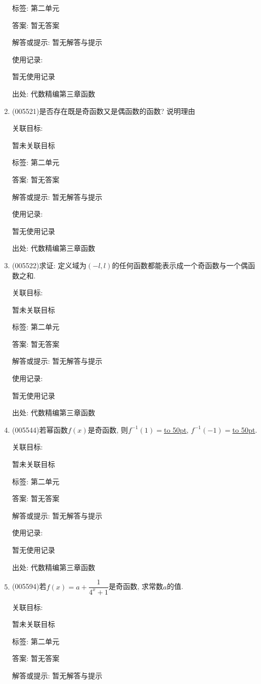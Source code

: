\documentclass[10pt,a4paper]{article}
\newcommand{\blank}[1]{\underline{\hbox to #1pt{}}}
\begin{document}
\begin{enumerate}[1.]
标签: 第二单元

答案: 暂无答案

解答或提示: 暂无解答与提示

使用记录:

暂无使用记录


出处: 代数精编第三章函数
\item { (005521)}是否存在既是奇函数又是偶函数的函数? 说明理由


关联目标:

暂未关联目标



标签: 第二单元

答案: 暂无答案

解答或提示: 暂无解答与提示

使用记录:

暂无使用记录


出处: 代数精编第三章函数
\item { (005522)}求证: 定义域为$(-l,l)$的任何函数都能表示成一个奇函数与一个偶函数之和.


关联目标:

暂未关联目标



标签: 第二单元

答案: 暂无答案

解答或提示: 暂无解答与提示

使用记录:

暂无使用记录


出处: 代数精编第三章函数
\item { (005544)}若幂函数$f(x)$是奇函数, 则$f^{-1}(1)=$\blank{50}, $f^{-1}(-1)=$\blank{50}.


关联目标:

暂未关联目标



标签: 第二单元

答案: 暂无答案

解答或提示: 暂无解答与提示

使用记录:

暂无使用记录


出处: 代数精编第三章函数
\item { (005594)}若$f(x)=a+\dfrac 1{4^x+1}$是奇函数, 求常数$a$的值.


关联目标:

暂未关联目标



标签: 第二单元

答案: 暂无答案

解答或提示: 暂无解答与提示


\end{enumerate}
\end{document}
